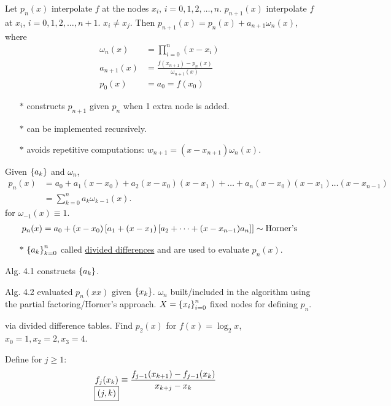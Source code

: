\documentclass[]{article}
\begin{document}
\begin{theorem}
	Let $p_n(x)$ interpolate $f$ at the nodes $x_i$, $i=0,1,2,\dots,n$.
	$p_{n+1}(x)$ interpolate $f$ at $x_i$, $i=0,1,2,\dots,n+1$. $x_i\neq x_j$.
	Then $p_{n+1}(x) = p_n(x) + a_{n+1}\omega_n(x)$, where
	\begin{align*}
		\omega_n(x) &= \prod_{i=0}^n (x-x_i) \\
		a_{n+1}(x) &= \frac{f(x_{n+1})-p_n(x)}{\omega_{n+1}(x)} \\
		p_0(x) &= a_0 = f(x_0)
	\end{align*}
	\begin{enumerate}
		\item[$*$] constructs $p_{n+1}$ given $p_n$ when 1 extra node is added.
		\item[$*$] can be implemented recursively.
		\item[$*$] avoids repetitive computations: $w_{n+1} = (x-x_{n+1})\omega_n(x)$.
	\end{enumerate}
\end{theorem}
\begin{corollary}
	Given $\left\{ a_k \right\}$ and $\omega_n$,
	\begin{align*}
		p_n(x) &= a_0 + a_1(x-x_0) + a_2(x-x_0)(x-x_1) + \dots + a_n(x-x_0)(x-x_1)\dots(x-x_{n-1}) \\
			   &= \sum_{k=0}^n a_k\omega_{k-1}(x).
	\end{align*}
	for $\omega_{-1}(x)\equiv1$.
	\begin{align*}
		p_n(x) = a_0 + (x-x_0)\left[a_1 + (x-x_1)\left[a_2 + \dots + (x-x_{n-1})a_n\right]\right] \sim \text{Horner's}
	\end{align*}
	\begin{enumerate}
		\item[$*$] $\left\{ a_k \right\}_{k=0}^n$ called \ul{divided differences} and are used to evaluate $p_n(x)$.
	\end{enumerate}
\end{corollary}
Alg. 4.1 constructs $\left\{ a_k \right\}$.

Alg. 4.2 evaluated $p_n(xx)$ given $\left\{ x_k \right\}$.
$\omega_n$ built/included in the algorithm using the partial factoring/Horner's approach.
$X = \left\{ x_i \right\}_{i=0}^n$ fixed nodes for defining $p_n$.

\newpage
\begin{example}
	 via divided difference tables.
	Find $p_2(x)$ for $f(x)=\log_2x$, $x_0=1,x_2=2,x_3=4$.
\end{example}

	Define for $j\geq1$: 
	\begin{align*}
		\underset{\fbox{$(j,k)$}}{f_j(x_k)} &\equiv \frac{f_{j-1}(x_{k+1})-f_{j-1}(x_k)}{x_{k+j}-x_k}
	\end{align*}
\end{document}
